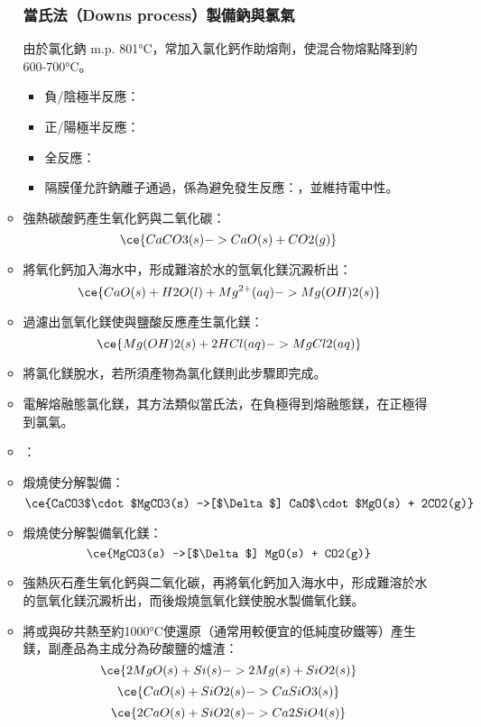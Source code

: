 \documentclass[a4paper,12pt]{report}
\begin{document}
\begin{itemize}
\begin{itemize}
\subsubsection{當氏法（Downs process）製備鈉與氯氣}
由於氯化鈉 m.p. 801°C，常加入氯化鈣作助熔劑，使混合物熔點降到約600-700°C。
\begin{itemize}
\item 負/陰極半反應：
\item 正/陽極半反應：
\item 全反應：
\item 隔膜僅允許鈉離子通過，係為避免發生反應：，並維持電中性。
\end{itemize}
\ben
\item 強熱碳酸鈣產生氧化鈣與二氧化碳：
\[\ce{CaCO3(s) -> CaO(s) + CO2(g)}\]
\item 將氧化鈣加入海水中，形成難溶於水的氫氧化鎂沉澱析出：
\[\ce{CaO(s) + H2O(l) + Mg^{2+}(aq) -> Mg(OH)2(s)}\]
\item 過濾出氫氧化鎂使與鹽酸反應產生氯化鎂：
\[\ce{Mg(OH)2(s) + 2HCl(aq) -> MgCl2(aq)}\]
\item 將氯化鎂脫水，若所須產物為氯化鎂則此步驟即完成。
\item 電解熔融態氯化鎂，其方法類似當氏法，在負極得到熔融態鎂，在正極得到氯氣。
\een
{}
\bit
\item {}：
\bit
\item 煅燒使分解製備：
\[\ce{CaCO3$\cdot$MgCO3(s) ->[$\Delta$] CaO$\cdot$MgO(s) + 2CO2(g)}\]
\item 煅燒使分解製備氧化鎂：
\[\ce{MgCO3(s) ->[$\Delta$] MgO(s) + CO2(g)}\]
\item 強熱灰石產生氧化鈣與二氧化碳，再將氧化鈣加入海水中，形成難溶於水的氫氧化鎂沉澱析出，而後煅燒氫氧化鎂使脫水製備氧化鎂。
\eit
\item 將或與矽共熱至約1000°C使還原（通常用較便宜的低純度矽鐵等）產生鎂，副產品為主成分為矽酸鹽的爐渣：
\[\ce{2MgO(s) + Si(s) -> 2Mg(s) + SiO2(s)}\]
\[\ce{CaO(s) + SiO2(s) -> CaSiO3(s)}\]
\[\ce{2CaO(s) + SiO2(s) -> Ca2SiO4(s)}\]
\eit

\end{itemize}
\end{itemize}
\end{document}
